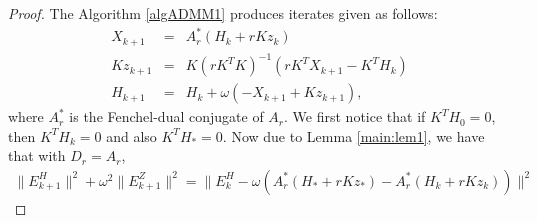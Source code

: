 \begin{proof} 
The Algorithm \ref{algADMM1} produces iterates given as follows: 
\begin{eqnarray*}
X_{k+1} &=& A_r^* (H_k + r K z_k) \\
Kz_{k+1} &=& K(rK^TK)^{-1} (rK^T X_{k+1} - K^TH_k) \\ 
H_{k+1} &=& H_k + \omega (-X_{k+1} + Kz_{k+1} ), 
\end{eqnarray*}
where $A_r^*$ is the Fenchel-dual conjugate of $A_r$. We first notice that if $K^TH_0 = 0$, then $K^TH_k = 0$ and also $K^TH_* = 0$. Now due to Lemma \ref{main:lem1}, we have that with $D_r = A_r$,  
\begin{eqnarray*}
\|E_{k+1}^H\|^2 + \omega^2 \|E_{k+1}^Z\|^2 = \|E_k^H - \omega (A_r^{*} (H_* + r K z_*) - A_r^{*} (H_k + r K z_k))\|^2 %
\end{eqnarray*}
\begin{comment} 
On the other hand, we have that 
\begin{eqnarray*}
X_{*} &=& A_r^{*} (H_* + r K z_*) \\
Kz_{*} &=& P_Z [A_r^{*}(H_* + rK z_*)] \\ 
H_{*} &=& H_* + \omega (-X_{*} + K z_{*}). 
\end{eqnarray*}
Therefore, we have the following error equation: 
\begin{eqnarray*}
X_{*} - X_{k+1} &=& A_r^{*} (H_* + r K z_*) - A_r^{*} (H_k + r K z_k) \\
Kz_{*} - Kz_{k+1} &=& P_Z [ A_r^{*} (H_* + rK z_*) - A_r^{*} (H_k + rK z_k) ]. 
\end{eqnarray*}
The trick is to multiply $-\omega$ for $E_{k+1}^Z$ error term and to obtain 
\begin{eqnarray*}
-\omega \left ( Kz_{*} - Kz_{k+1} \right ) = -\omega \left ( P_Z [ A_r^{*} (H_* + rK z_*) - A_r^{*} (H_k + rK z_k) ] \right ). 
\end{eqnarray*}
Lastly, for $H$, we have 
\begin{eqnarray*}
H_{*} - H_{k+1} &=& H_* - H_k + \omega ( -X_* + X_{k+1} + Kz_* - K z_{k+1} ) \\ 

\end{comment}
\end{proof}
